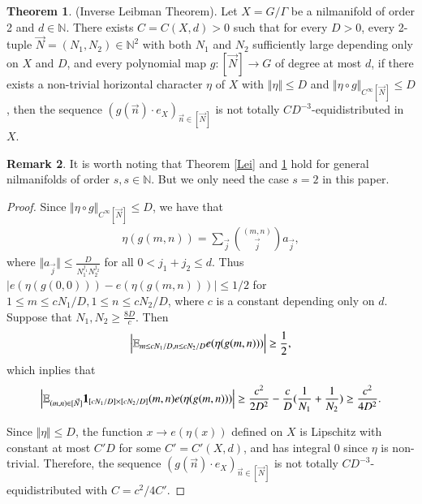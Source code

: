 \documentclass[12pt,amstex]{amsart}
\theoremstyle{definition}
\newtheorem{thm}{Theorem}[section]
\newtheorem{rem}[thm]{Remark}
\begin{document}
\begin{thm}\label{inv}(Inverse Leibman Theorem).
  Let $X=G/\Gamma$ be a nilmanifold of order 2 and $d\in\mathbb{N}$. There exists $C=C(X,d)>0$ such that for every $D>0$, every 2-tuple $\vec{N}=(N_{1},N_{2})\in\mathbb{N}^{2}$ with both $N_{1}$ and $N_{2}$ sufficiently large depending only on $X$ and $D$, and every polynomial map $g\colon [\vec{N}]\rightarrow G$ of degree at most $d$, if there exists a non-trivial horizontal character $\eta$ of $X$ with $\Vert\eta\Vert\leq D$ and $\Vert \eta\circ g\Vert_{C^{\infty}[\vec{N}]}\leq D$, then the sequence $(g(\vec{n})\cdot e_{X})_{\vec{n}\in[\vec{N}]}$ is not totally $CD^{-3}$-equidistributed in $X$.
\end{thm}
\begin{rem}
  It is worth noting that Theorem \ref{Lei} and \ref{inv} hold for general nilmanifolds of order $s, s\in\mathbb{N}$. But we only need the case $s=2$ in this paper.
\end{rem}
\begin{proof}
  Since $\Vert \eta\circ g\Vert_{C^{\infty}[\vec{N}]}\leq D$, we have that
    \begin{equation}\nonumber
  \begin{split}
  \eta(g(m,n))=\sum_{\vec{j}}\binom{(m,n)}{\vec{j}}a_{\vec{j}},
  \end{split}
\end{equation}
where $\Vert a_{\vec{j}}\Vert\leq\frac{D}{N_{1}^{j_{1}}N_{2}^{j_{2}}}$ for all $0< j_{1}+j_{2}\leq d$. Thus
$\vert e(\eta(g(0,0)))-e(\eta(g(m,n)))\vert\leq 1/2$ for $1\leq m\leq cN_{1}/D, 1\leq n\leq cN_{2}/D$, where $c$ is a constant depending only on $d$. Suppose that $N_{1},N_{2}\geq\frac{8D}{c}$. Then
    \begin{equation}\nonumber
  \begin{split}
  \Bigl\vert\mathbb{E}_{m\leq cN_{1}/D, n\leq cN_{2}/D}e(\eta(g(m,n)))\Bigr\vert\geq\frac{1}{2},
  \end{split}
\end{equation}
which inplies that
    \begin{equation}\nonumber
  \begin{split}
  \Bigl\vert\mathbb{E}_{(m,n)\in[\vec{N}]}\bold{1}_{[cN_{1}/D]\times[cN_{2}/D]}(m,n)
    e(\eta(g(m,n)))\Bigr\vert\geq\frac{c^{2}}{2D^{2}}-\frac{c}{D}(\frac{1}{N_{1}}+\frac{1}{N_{2}})
\geq\frac{c^{2}}{4D^{2}}.
  \end{split}
\end{equation}

 Since $\Vert\eta\Vert\leq D$, the function $x\rightarrow e(\eta(x))$ defined on $X$ is Lipschitz with constant at most $C'D$ for some $C'=C'(X,d)$, and has integral 0 since $\eta$ is non-trivial. Therefore, the sequence $(g(\vec{n})\cdot e_{X})_{\vec{n}\in[\vec{N}]}$ is not totally $CD^{-3}$-equidistributed with $C=c^{2}/4C'$.
\end{proof}
\end{document}

